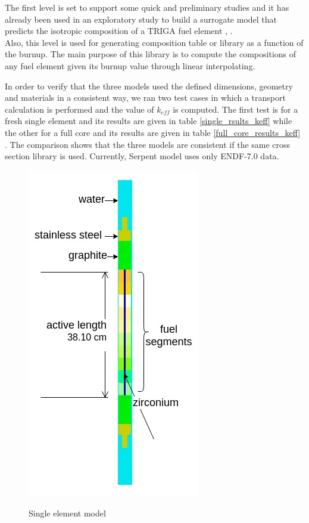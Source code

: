 \documentclass[review,number,sort&compress,12pt]{elsarticle}
\begin{document}
The first level is set to support some quick and preliminary studies and it has already been used in an exploratory study to build a surrogate model that predicts the isotropic composition of a TRIGA fuel element \cite{abdo2018dds}, \cite{elzohery2018cbg}.\\
Also, this level is used for generating composition table or library as a function of the burnup. The main purpose of this library is to compute the compositions of any fuel element  given its burnup value through linear interpolating.

In order to verify that the three models used the defined dimensions, geometry and materials in a consistent way, we ran two test cases in which a transport calculation is performed and the value of $k_{eff}$ is computed. 
The first test is for a fresh single element and its results are given in table \ref{single_rsults_keff} while the other for a full core and its results are given in table \ref{full_core_results_keff} \\.
The comparison shows that the three models are consistent if the same cross section library is used. Currently, Serpent model uses only ENDF-7.0 data.\\


\begin{figure}[h]
\centering
\includegraphics[scale=0.5]{single_element.jpg}\\
\caption{Single element model}
\label{fig:sigle_element_model}
\end{figure}
\end{document}
